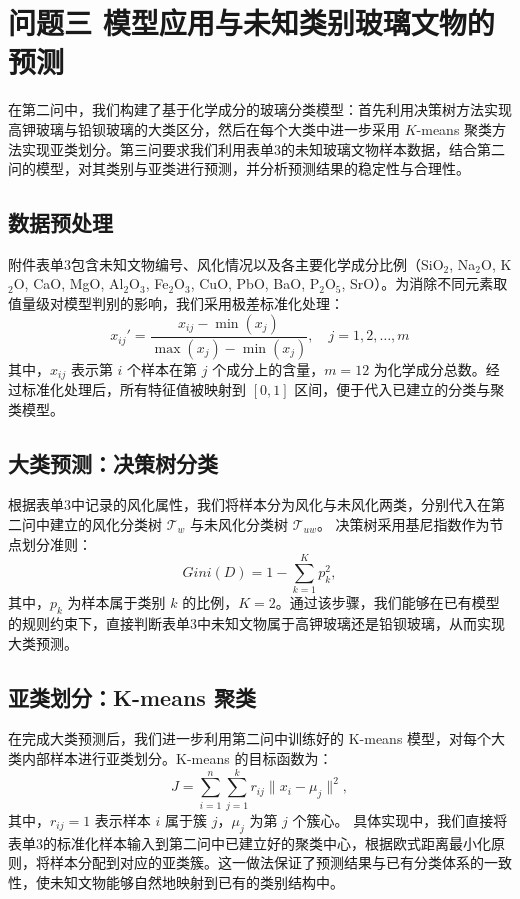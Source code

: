 \documentclass[withoutpreface,bwprint]{cumcmthesis}
\begin{document}
\section{问题三 模型应用与未知类别玻璃文物的预测}
在第二问中，我们构建了基于化学成分的玻璃分类模型：首先利用决策树方法实现高钾玻璃与铅钡玻璃的大类区分，然后在每个大类中进一步采用 $K$-means 聚类方法实现亚类划分。第三问要求我们利用表单3的未知玻璃文物样本数据，结合第二问的模型，对其类别与亚类进行预测，并分析预测结果的稳定性与合理性。

\subsection{数据预处理}
附件表单3包含未知文物编号、风化情况以及各主要化学成分比例（SiO$_2$, Na$_2$O, K$_2$O, CaO, MgO, Al$_2$O$_3$, Fe$_2$O$_3$, CuO, PbO, BaO, P$_2$O$_5$, SrO）。为消除不同元素取值量级对模型判别的影响，我们采用极差标准化处理：
\begin{equation}
x_{ij}' = \frac{x_{ij} - \min(x_j)}{\max(x_j) - \min(x_j)}, 
\quad j = 1,2,\dots,m
\end{equation}
其中，$x_{ij}$ 表示第 $i$ 个样本在第 $j$ 个成分上的含量，$m=12$ 为化学成分总数。经过标准化处理后，所有特征值被映射到 $[0,1]$ 区间，便于代入已建立的分类与聚类模型。

\subsection{大类预测：决策树分类}
根据表单3中记录的风化属性，我们将样本分为风化与未风化两类，分别代入在第二问中建立的风化分类树 $\mathcal{T}_{w}$ 与未风化分类树 $\mathcal{T}_{uw}$。  
决策树采用基尼指数作为节点划分准则：
\begin{equation}
Gini(D) = 1 - \sum_{k=1}^{K} p_k^2,
\end{equation}
其中，$p_k$ 为样本属于类别 $k$ 的比例，$K=2$。通过该步骤，我们能够在已有模型的规则约束下，直接判断表单3中未知文物属于高钾玻璃还是铅钡玻璃，从而实现大类预测。

\subsection{亚类划分：K-means 聚类}
在完成大类预测后，我们进一步利用第二问中训练好的 K-means 模型，对每个大类内部样本进行亚类划分。K-means 的目标函数为：
\begin{equation}
J = \sum_{i=1}^{n} \sum_{j=1}^{k} r_{ij} \| x_i - \mu_j \|^2,
\end{equation}
其中，$r_{ij}=1$ 表示样本 $i$ 属于簇 $j$，$\mu_j$ 为第 $j$ 个簇心。  
具体实现中，我们直接将表单3的标准化样本输入到第二问中已建立好的聚类中心，根据欧式距离最小化原则，将样本分配到对应的亚类簇。这一做法保证了预测结果与已有分类体系的一致性，使未知文物能够自然地映射到已有的类别结构中。
\end{document}
